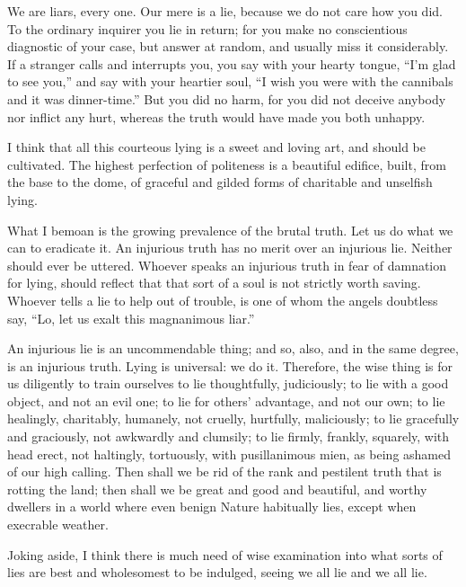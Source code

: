 \documentclass[../../demo.tex]{novelettesubdoc}
\begin{document}
We are liars, every one. Our mere 
is a lie, because we do not care how you did.
To the ordinary inquirer you lie in return; for you make
no conscientious diagnostic of your case, but answer at random, and
usually miss it considerably. If a stranger calls and interrupts
you, you say with your hearty tongue, ``I'm glad to see you,'' and say
with your heartier soul, ``I wish you were with the cannibals and it was
dinner-time.'' But you did no harm, for you did not
deceive anybody nor inflict any hurt, whereas the truth would have made
you both unhappy.

I think that all this courteous lying is a sweet and loving art, and
should be cultivated. The highest perfection of politeness is
a beautiful edifice, built, from the base to the dome, of graceful and
gilded forms of charitable and unselfish lying.

What I bemoan is the growing prevalence of the brutal truth. Let us do
what we can to eradicate it. An injurious truth has no merit over an
injurious lie. Neither should ever be uttered. Whoever speaks an
injurious truth in fear of damnation for lying, should
reflect that that sort of a soul is not strictly worth saving.
Whoever tells a lie to help  out of trouble,
is one of whom the angels doubtless say, ``Lo, let us exalt this
magnanimous liar.''

An injurious lie is an uncommendable thing; and so, also, and in the same
degree, is an injurious truth. Lying is universal: we  do it.
Therefore, the wise thing is for us
diligently to train ourselves to lie thoughtfully, judiciously; to lie
with a good object, and not an evil one; to lie for others' advantage,
and not our own; to lie healingly, charitably, humanely, not cruelly,
hurtfully, maliciously; to lie gracefully and graciously, not awkwardly
and clumsily; to lie firmly, frankly, squarely, with head erect, not
haltingly, tortuously, with pusillanimous mien, as being ashamed of our
high calling. Then shall we be rid of the rank and pestilent truth that
is rotting the land; then shall we be great and good and beautiful, and
worthy dwellers in a world where even benign Nature habitually lies,
except when execrable weather.

Joking aside, I think there is much need of wise examination into what
sorts of lies are best and wholesomest to be indulged, seeing we 
all lie and we  all lie.
\end{document}
